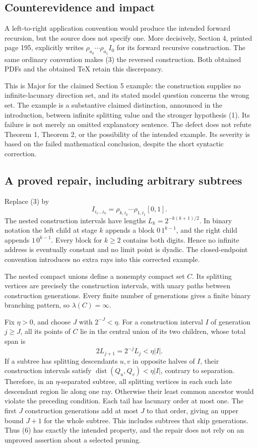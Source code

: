 \documentclass[10pt]{article}
\begin{document}
\subsection*{Counterevidence and impact}
A left-to-right application convention would produce the intended forward recursion, but the source does not specify one. More decisively, Section 4, printed page 195, explicitly writes \(\rho_{a_k}\cdots\rho_{a_1}I_0\) for its forward recursive construction. The same ordinary convention makes (3) the reversed construction. Both obtained PDFs and the obtained TeX retain this discrepancy.\par
This is Major for the claimed Section 5 example: the construction supplies no infinite-lacunary direction set, and its stated model question concerns the wrong set. The example is a substantive claimed distinction, announced in the introduction, between infinite splitting value and the stronger hypothesis (1). Its failure is not merely an omitted explanatory sentence. The defect does not refute Theorem 1, Theorem 2, or the possibility of the intended example. Its severity is based on the failed mathematical conclusion, despite the short syntactic correction.\par
\subsection*{A proved repair, including arbitrary subtrees}
Replace (3) by \[I_{i_1\ldots i_k}
 =\rho_{k,i_k}\cdots\rho_{1,i_1}[0,1].
 \tag{6}\] The nested construction intervals have lengths \(L_k=2^{-k(k+1)/2}\). In binary notation the left child at stage \(k\) appends a block \(0\,1^{k-1}\), and the right child appends \(1\,0^{k-1}\). Every block for \(k\ge2\) contains both digits. Hence no infinite address is eventually constant and no limit point is dyadic. The closed-endpoint convention introduces no extra rays into this corrected example.\par
The nested compact unions define a nonempty compact set \(C\). Its splitting vertices are precisely the construction intervals, with unary paths between construction generations. Every finite number of generations gives a finite binary branching pattern, so \(\lambda(C)=\infty\).\par
Fix \(\eta>0\), and choose \(J\) with \(2^{-J}<\eta\). For a construction interval \(I\) of generation \(j\ge J\), all its points of \(C\) lie in the central union of its two children, whose total span is \[2L_{j+1}=2^{-j}L_j<\eta |I|.\] If a subtree has splitting descendants \(u,v\) in opposite halves of \(I\), their construction intervals satisfy \(\operatorname{dist}(Q_u,Q_v)<\eta |I|\), contrary to separation. Therefore, in an \(\eta\)-separated subtree, all splitting vertices in each such late descendant region lie along one ray. Otherwise their least common ancestor would violate the preceding condition. Each tail has lacunary order at most one. The first \(J\) construction generations add at most \(J\) to that order, giving an upper bound \(J+1\) for the whole subtree. This includes subtrees that skip generations. Thus (6) has exactly the intended property, and the repair does not rely on an unproved assertion about a selected pruning.\par
\end{document}
